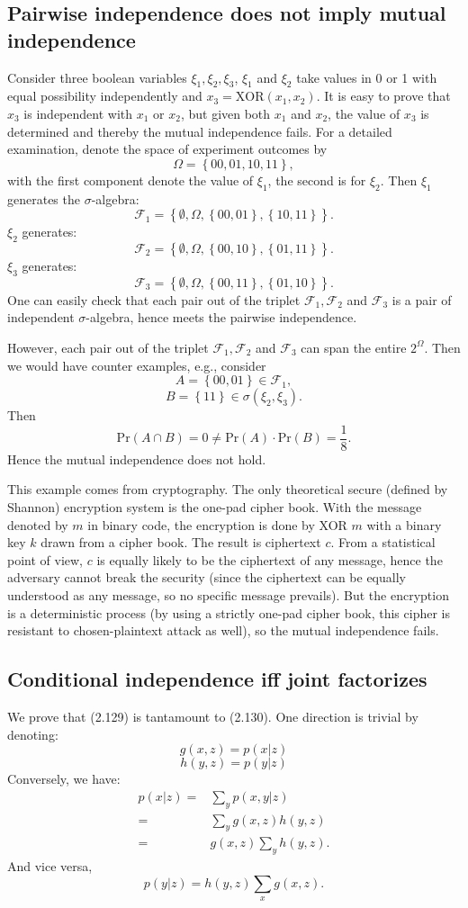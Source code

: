 \documentclass[UTF8]{ctexart}
\begin{document}
\subsection{Pairwise independence does not imply mutual independence}
Consider three boolean variables $\xi_{1},\xi_{2},\xi_{3}$, $\xi_{1}$ and $\xi_{2}$ take values in 0 or 1 with equal possibility independently and $x_{3}=\text{XOR}(x_{1},x_{2})$.
It is easy to prove that $x_{3}$ is independent with $x_{1}$ or $x_{2}$, but given both $x_{1}$ and $x_{2}$, the value of $x_{3}$ is determined and thereby the mutual independence fails.
For a detailed examination, denote the space of experiment outcomes by
$$\Omega=\left\{00,01,10,11 \right\},$$
with the first component denote the value of $\xi_{1}$, the second is for $\xi_{2}$.
Then $\xi_{1}$ generates the $\sigma$-algebra:
$$\mathcal{F}_{1}=\left\{\emptyset,\Omega,\left\{00,01\right\},\left\{10,11\right\} \right\}.$$
$\xi_{2}$ generates:
$$\mathcal{F}_{2}=\left\{\emptyset,\Omega,\left\{00,10\right\},\left\{01,11\right\} \right\}.$$
$\xi_{3}$ generates:
$$\mathcal{F}_{3}=\left\{\emptyset,\Omega,\left\{00,11\right\},\left\{01,10\right\} \right\}.$$
One can easily check that each pair out of the triplet $\mathcal{F}_{1},\mathcal{F}_{2}$ and $\mathcal{F}_{3}$ is a pair of independent $\sigma$-algebra, hence meets the pairwise independence.

However, each pair out of the triplet $\mathcal{F}_{1},\mathcal{F}_{2}$ and $\mathcal{F}_{3}$ can span the entire $2^{\Omega}$.
Then we would have counter examples, e.g., consider
$$A=\left\{00,01\right\}\in\mathcal{F}_{1},$$
$$B=\left\{11\right\}\in\sigma(\xi_{2},\xi_{3}).$$
Then
$$\text{Pr}(A\cap B)=0\neq \text{Pr}(A)\cdot\text{Pr}(B)=\frac{1}{8}.$$
Hence the mutual independence does not hold.

This example comes from cryptography.
The only theoretical secure (defined by Shannon) encryption system is the one-pad cipher book.
With the message denoted by $m$ in binary code, the encryption is done by XOR $m$ with a binary key $k$ drawn from a cipher book.
The result is ciphertext $c$.
From a statistical point of view, $c$ is equally likely to be the ciphertext of any message, hence the adversary cannot break the security (since the ciphertext can be equally understood as any message, so no specific message prevails).
But the encryption is a deterministic process (by using a strictly one-pad cipher book, this cipher is resistant to chosen-plaintext attack as well), so the mutual independence fails.

\subsection{Conditional independence iff joint factorizes}
We prove that (2.129) is tantamount to (2.130).
One direction is trivial by denoting:
$$g(x,z)=p(x|z)$$
$$h(y,z)=p(y|z)$$
Conversely, we have:
$$
\begin{aligned}
p(x|z)=&\sum_{y}p(x,y|z)  \\
=&\sum_{y}g(x,z)h(y,z)  \\
=&g(x,z)\sum_{y}h(y,z).
\end{aligned}
$$
And vice versa,
$$p(y|z)=h(y,z)\sum_{x}g(x,z).$$
\end{document}
